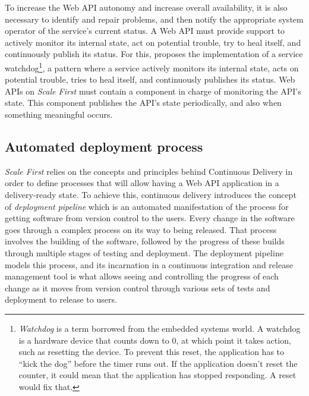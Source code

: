 \documentclass[10pt,article]{IEEEtran}
\begin{document}
To increase the Web API autonomy and increase overall availability, it is also necessary to identify and repair problems, and then notify the appropriate system operator of the service's current status. A Web API must provide support to actively monitor its internal state, act on potential trouble, try to heal itself, and continuously publish its status. For this, \cite{soapatterns} proposes the implementation of a service watchdog\footnote{\textit{Watchdog} is a term borrowed from the embedded systems world. A watchdog is a hardware device that counts down to 0, at which point it takes action, such as resetting the device. To prevent this reset, the application has to ``kick the dog'' before the timer runs out. If the application doesn't reset the counter, it could mean that the application has stopped responding. A reset would fix that.}, a pattern where a service actively monitors its internal state, acts on potential trouble, tries to heal itself, and continuously publishes its status. Web APIs on \textit{Scale First} must contain a component in charge of monitoring the API's state. This component publishes the API's state periodically, and also when something meaningful occurs.




\subsection{Automated deployment process}
\textit{Scale First} relies on the concepts and principles behind Continuous Delivery\cite{humble} in order to define processes that will allow having a Web API application in a delivery-ready state. To achieve this, continuous delivery introduces the concept of \textit{deployment pipeline} which is an automated manifestation of the process for getting software from version control to the users. Every change in the software goes through a complex process on its way to being released. That process involves the building of the software, followed by the progress of these builds through multiple stages of testing and deployment. The deployment pipeline models this process, and its incarnation in a continuous integration and release management tool is what allows seeing and controlling the progress of each change as it moves from version control through various sets of tests and deployment to release to users. %
\end{document}
